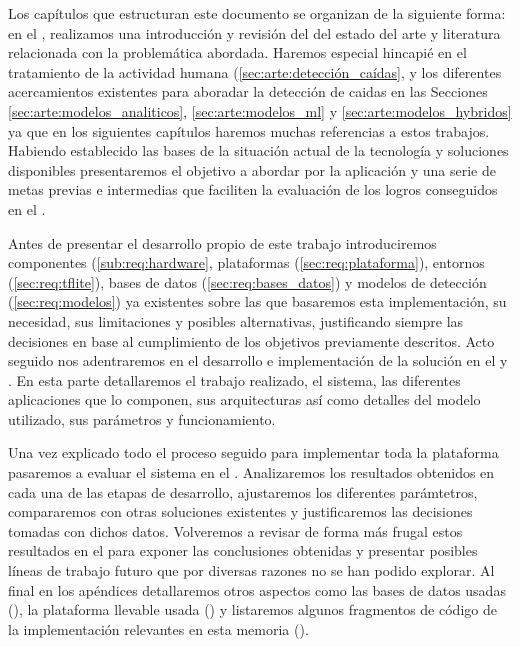 Los capítulos que estructuran este documento se organizan de la siguiente forma: en el , realizamos una introducción y revisión del del estado del arte y literatura relacionada con la problemática abordada. Haremos especial hincapié en el tratamiento de la actividad humana (\autoref{sec:arte:detección_caídas}, y los diferentes acercamientos existentes para aboradar la detección de caidas en las Secciones \ref{sec:arte:modelos_analiticos}, \ref{sec:arte:modelos_ml} y \ref{sec:arte:modelos_hybridos} ya que en los siguientes capítulos haremos muchas referencias a estos trabajos. Habiendo establecido las bases de la situación actual de la tecnología y soluciones disponibles presentaremos el objetivo a abordar por la aplicación y una serie de metas previas e intermedias que faciliten la evaluación de los logros conseguidos en el .   

Antes de presentar el desarrollo propio de este trabajo introduciremos componentes (\ref{sub:req:hardware}, plataformas (\ref{sec:req:plataforma}), entornos (\ref{sec:req:tflite}), bases de datos (\ref{sec:req:bases_datos}) y modelos de detección (\ref{sec:req:modelos}) ya existentes sobre las que basaremos esta implementación, su necesidad, sus limitaciones y posibles alternativas, justificando siempre las decisiones en base al cumplimiento de los objetivos previamente descritos. Acto seguido nos adentraremos en el desarrollo e implementación de la solución en el  y . En esta parte detallaremos el trabajo realizado, el sistema, las diferentes aplicaciones que lo componen, sus arquitecturas así como detalles del modelo utilizado, sus parámetros y funcionamiento.

Una vez explicado todo el proceso seguido para implementar toda la plataforma pasaremos a evaluar el sistema en el . Analizaremos los resultados obtenidos en cada una de las etapas de desarrollo, ajustaremos los diferentes parámtetros, compararemos con otras soluciones existentes y justificaremos las decisiones tomadas con dichos datos. Volveremos a revisar de forma más frugal estos resultados en el  para exponer las conclusiones obtenidas y presentar posibles líneas de trabajo futuro que por diversas razones no se han podido explorar. Al final en los apéndices detallaremos otros aspectos como las bases de datos usadas (), la plataforma llevable usada () y listaremos algunos fragmentos de código de la implementación relevantes en esta memoria ().

